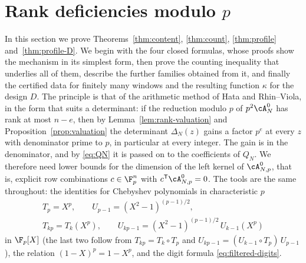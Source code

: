 \section{Rank deficiencies modulo $p$}\label{sec:content}

In this section we prove Theorems~\ref{thm:content}, \ref{thm:count}, \ref{thm:profile}
and~\ref{thm:profile-D}. We begin with the four closed formulas, whose proofs show the mechanism in its
simplest form, then prove the counting inequality that underlies all of them, describe the further
families obtained from it, and finally the certified data for finitely many windows and the resulting
function $\kappa$ for the design $D$. The principle is that of the arithmetic method of Hata
and Rhin--Viola, in the form that suits a determinant: if the reduction modulo $p$ of $p^2\cA^0_N$ has
rank at most $n-e$, then by Lemma~\ref{lem:rank-valuation} and Proposition~\ref{prop:valuation} the
determinant $\Delta_N(z)$ gains a factor $p^e$ at every $z$ with denominator prime to $p$, in
particular at every integer. The gain is in the denominator, and by \eqref{eq:QN} it is passed on to
the coefficients of $Q_N$. We therefore need lower bounds for the dimension of the left kernel of
$\cA^0_{N,p}$, that is, explicit row combinations $c\in\F_p^n$ with $c^{\mathsf T}\cA^0_{N,p}=0$. The
tools are the same throughout: the identities for Chebyshev polynomials in characteristic $p$
\begin{equation}\label{eq:cheb-p}
 \begin{gathered}
 T_p=X^p,\qquad U_{p-1}=(X^2-1)^{(p-1)/2},\\
 T_{kp}=T_k(X^p),\qquad U_{kp-1}=(X^2-1)^{(p-1)/2}\,U_{k-1}(X^p)
 \end{gathered}
\end{equation}
in $\F_p[X]$ (the last two follow from $T_{kp}=T_k\circ T_p$ and $U_{kp-1}=(U_{k-1}\circ T_p)\,U_{p-1}$), the relation
$(1-X)^p=1-X^p$, and the digit formula \eqref{eq:filtered-digits}.

